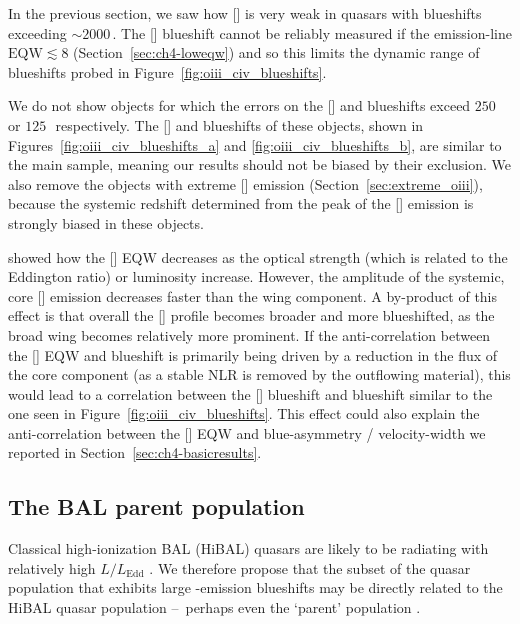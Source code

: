In the previous section, we saw how [] is very weak in quasars with  blueshifts exceeding $\sim2000$\,\kms.
The [] blueshift cannot be reliably measured if the emission-line $\text{EQW} \lesssim 8$ (Section~\ref{sec:ch4-loweqw}) and so this limits the dynamic range of  blueshifts probed in Figure~\ref{fig:oiii_civ_blueshifts}.

We do not show objects for which the errors on the [] and  blueshifts exceed $250$ or $125$\,\kms\, respectively.
The [] and  blueshifts of these objects, shown in Figures~\ref{fig:oiii_civ_blueshifts_a} and \ref{fig:oiii_civ_blueshifts_b}, are similar to the main sample, meaning our results should not be biased by their exclusion.
We also remove the objects with extreme [] emission (Section~\ref{sec:extreme_oiii}), because the systemic redshift determined from the peak of the [] emission is strongly biased in these objects.

\citet{shen14} showed how the [] EQW decreases as the optical  strength (which is related to the Eddington ratio) or luminosity increase.
However, the amplitude of the systemic, core [] emission decreases faster than the wing component.
A by-product of this effect is that overall the [] profile becomes broader and more blueshifted, as the broad wing becomes relatively more prominent.
If the anti-correlation between the [] EQW and  blueshift is primarily being driven by a reduction in the flux of the core component (as a stable NLR is removed by the outflowing material), this would lead to a correlation between the [] blueshift and  blueshift similar to the one seen in Figure~\ref{fig:oiii_civ_blueshifts}.
This effect could also explain the anti-correlation between the [] EQW and blue-asymmetry / velocity-width we reported in Section~\ref{sec:ch4-basicresults}.

\subsection{The BAL parent population}

Classical high-ionization BAL (HiBAL) quasars are likely to be radiating with relatively high $L/L_{\text{Edd}}$ \citep[e.g.][]{zhang14}.
We therefore propose that the subset of the quasar population that exhibits large -emission blueshifts may be directly related to the HiBAL quasar population \---\ perhaps even the `parent' population \citep{richards06conf}.

